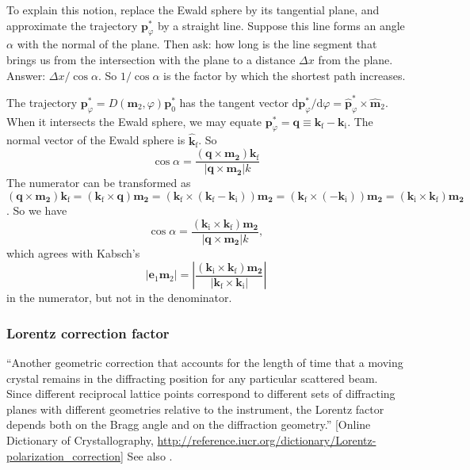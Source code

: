 \documentclass[twocolumn,preprintnumbers,amsmath,amssymb]{revtex4}
\def\v#1{\mathbf{#1}}
\begin{document}
To explain this notion,
replace the Ewald sphere by its tangential plane,
and approximate the trajectory $\v{p}^*_\varphi$ by a straight line.
Suppose this line forms an angle $\alpha$ with the normal of the plane.
Then ask: how long is the line segment that brings us from the intersection
with the plane to a distance $\Delta x$ from the plane.
Answer: $\Delta x/\cos\alpha$.
So $1/\cos\alpha$ is the factor by which the shortest path increases.

The trajectory $\v{p}^*_\varphi=D(\v{m}_2,\varphi)\v{p}^*_0$
has the tangent vector
$\mathrm{d}\v{p}^*_\varphi/\mathrm{d}\varphi=\v{\hat p}^*_\varphi\times\v{\hat m}_2$.
When it intersects the Ewald sphere,
we may equate $\v{p}^*_\varphi=\v{q}\equiv\v{k}_\text{f}-\v{k}_\text{i}$.
The normal vector of the Ewald sphere is $\v{\hat k}_\text{f}$.
So
\begin{equation}
  \cos\alpha = \frac{(\v{q}\times\v{m_2})\v{k}_\text{f}}{|\v{q}\times\v{m_2}| k}
\end{equation}
The numerator can be transformed as
$(\v{q}\times\v{m_2})\v{k}_\text{f}
=(\v{k}_\text{f}\times\v{q})\v{m_2}
=(\v{k}_\text{f}\times(\v{k}_\text{f}-\v{k}_\text{i}))\v{m_2}
=(\v{k}_\text{f}\times(-\v{k}_\text{i}))\v{m_2}
=(\v{k}_\text{i}\times\v{k}_\text{f})\v{m_2}$.
So we have
\begin{equation}
  \cos\alpha = \frac{(\v{k}_\text{i}\times\v{k}_\text{f})\v{m_2}}{|\v{q}\times\v{m_2}| k},
\end{equation}
which agrees with Kabsch's
\begin{equation}
  |\v{e}_1\v{m}_2|
  =\left|\frac{(\v{k}_\text{i}\times\v{k}_\text{f})\v{m_2}}{|\v{k}_\text{f}\times\v{k}_\text{i}|}\right|
\end{equation}
in the numerator, but not in the denominator.


\subsubsection{Lorentz correction factor}

``Another geometric correction that accounts for the length of time that a moving crystal remains in the diffracting position for any particular scattered beam. Since different reciprocal lattice points correspond to different sets of diffracting planes with different geometries relative to the instrument, the Lorentz factor depends both on the Bragg angle and on the diffraction geometry.''
[Online Dictionary of Crystallography,
\url{http://reference.iucr.org/dictionary/Lorentz-polarization_correction}]
See also \cite{Bue40}.



\end{document}
